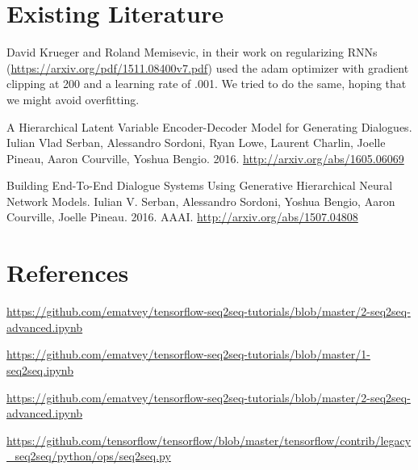 \section{Existing Literature}

David Krueger and Roland Memisevic, in their work on regularizing RNNs (\url{https://arxiv.org/pdf/1511.08400v7.pdf}) used the adam optimizer with gradient clipping at 200 and a learning rate of .001. We tried to do the same, hoping that we might avoid overfitting.

A Hierarchical Latent Variable Encoder-Decoder Model for Generating Dialogues. Iulian Vlad Serban, Alessandro Sordoni, Ryan Lowe, Laurent Charlin, Joelle Pineau, Aaron Courville, Yoshua Bengio. 2016. \url{http://arxiv.org/abs/1605.06069}

Building End-To-End Dialogue Systems Using Generative Hierarchical Neural Network Models. Iulian V. Serban, Alessandro Sordoni, Yoshua Bengio, Aaron Courville, Joelle Pineau. 2016. AAAI. \url{http://arxiv.org/abs/1507.04808}

\section{References}
\label{sec:ref}

\url{https://github.com/ematvey/tensorflow-seq2seq-tutorials/blob/master/2-seq2seq-advanced.ipynb}

\url{https://github.com/ematvey/tensorflow-seq2seq-tutorials/blob/master/1-seq2seq.ipynb}

\url{https://github.com/ematvey/tensorflow-seq2seq-tutorials/blob/master/2-seq2seq-advanced.ipynb}

\url{https://github.com/tensorflow/tensorflow/blob/master/tensorflow/contrib/legacy_seq2seq/python/ops/seq2seq.py}